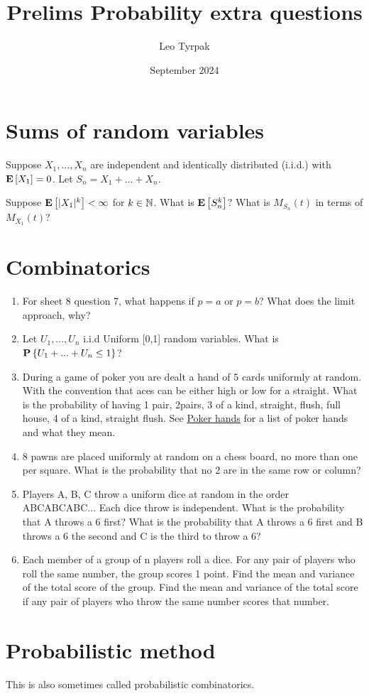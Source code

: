 \documentclass{article}
\title{Prelims Probability extra questions}
\author{Leo Tyrpak}
\date{September 2024}
\begin{document}
\maketitle
\section{Sums of random variables}
Suppose $X_1,...,X_n$ are independent and identically distributed (i.i.d.) with ${\mathbf E}\left[X_1\right]=0$.
Let $S_n=X_1+...+X_n$.

Suppose ${\mathbf E}\left[|X_1|^k\right]<\infty$ for $k\in{\mathbb N}$.
What is ${\mathbf E}\left[S_n^k\right]$? What is $M_{S_n}(t)$ in terms of $M_{X_1}(t)$?
\section{Combinatorics}
\begin{enumerate}
    \item For sheet 8 question 7, what happens if $p=a$ or $p=b$? What does the limit approach, why?
    \item Let $U_1,...,U_n$ i.i.d Uniform [0,1] random variables. What is ${\mathbf P}\left\{U_1+...+U_n\leq1\right\}$?
    \item During a game of poker you are dealt a hand of 5 cards uniformly at random. With the convention that aces can be either high or low for a straight. What is the probability of having 1 pair, 2pairs, 3 of a kind, straight, flush, full house, 4 of a kind, straight flush. See \href{https://en.wikipedia.org/wiki/List_of_poker_hands}{Poker hands} for a list of poker hands and what they mean.
    \item 8 pawns are placed uniformly at random on a chess board, no more than one per square. What is the probability that no 2 are in the same row or column?
    \item Players A, B, C throw a uniform dice at random in the order ABCABCABC... Each dice throw is independent. What is the probability that A throws a 6 first? What is the probability that A throws a 6 first and B throws a 6 the second and C is the third to throw a 6?
    \item Each member of a group of n players roll a dice. For any pair of players who roll the same number, the group scores 1 point. Find the mean and variance of the total score of the group. Find the mean and variance of the total score if any pair of players who throw the same number scores that number.
\end{enumerate}
\section{Probabilistic method}
This is also sometimes called probabilistic combinatorics.
\end{document}
